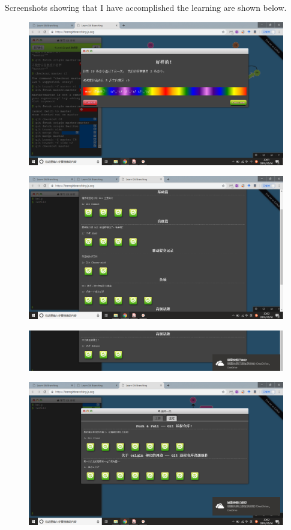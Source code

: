 \documentclass{article}
\begin{document}
Screenshots showing that I have accomplished the learning are shown below.

\begin{figure}[h]
\centering
\includegraphics[scale=0.3]{1.png}
\end{figure}
\begin{figure}[h]
    \centering
    \includegraphics[scale=0.3]{2.png}
    \end{figure}
    \begin{figure}[h]
        \centering
        \includegraphics[scale=0.3]{3.png}
        \end{figure}
        \begin{figure}[h]
            \centering
            \includegraphics[scale=0.3]{4.png}
            \end{figure}
\end{document}
